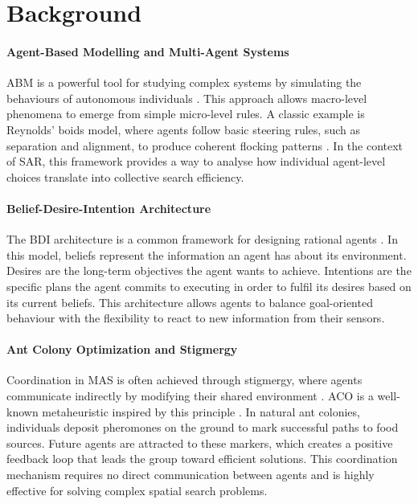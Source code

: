 \section{Background}

\paragraph{Agent-Based Modelling and Multi-Agent Systems}
ABM is a powerful tool for studying complex systems by simulating the behaviours of autonomous individuals \citep{ar:Schelling1971,ar:Macal2016}. This approach allows macro-level phenomena to emerge from simple micro-level rules. A classic example is Reynolds' boids model, where agents follow basic steering rules, such as separation and alignment, to produce coherent flocking patterns \citep{inpr:Reynolds1987}. In the context of SAR, this framework provides a way to analyse how individual agent-level choices translate into collective search efficiency.

\paragraph{Belief-Desire-Intention Architecture}
The BDI architecture is a common framework for designing rational agents \citep{bk:Bratman1987,inpr:RaoGeorgeff1991}. In this model, beliefs represent the information an agent has about its environment. Desires are the long-term objectives the agent wants to achieve. Intentions are the specific plans the agent commits to executing in order to fulfil its desires based on its current beliefs. This architecture allows agents to balance goal-oriented behaviour with the flexibility to react to new information from their sensors.

\paragraph{Ant Colony Optimization and Stigmergy}
Coordination in MAS is often achieved through stigmergy, where agents communicate indirectly by modifying their shared environment \citep{bk:Bonabeau1999}. ACO is a well-known metaheuristic inspired by this principle \citep{ar:Dorigo1996,bk:Dorigo2004}. In natural ant colonies, individuals deposit pheromones on the ground to mark successful paths to food sources. Future agents are attracted to these markers, which creates a positive feedback loop that leads the group toward efficient solutions. This coordination mechanism requires no direct communication between agents and is highly effective for solving complex spatial search problems.

